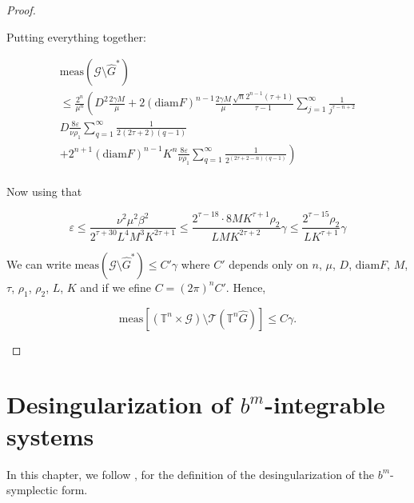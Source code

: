 \begin{proof}
\begin{enumerate}
Putting everything together:


$$
\begin{array}{llc}
\text{meas}(\mathcal{G}\setminus \hat G^*) \\
 \leq  \displaystyle \frac{2^n}{\mu^n}\left( D^2\frac{2\gamma M}{\mu} + 2(\text{diam}F)^{n-1}\frac{2\gamma M}{\mu}\frac{\sqrt{n} 2^{n-1} (\tau+1)}{\tau-1} \sum_{j=1}^\infty \frac{1}{j^{\tau - n + 2}}\right.\\
 \displaystyle  D\frac{8\varepsilon}{\nu \rho_1}\sum_{q=1}^{\infty}\frac{1}{2^{}(2\tau+2)(q-1)} \\
\displaystyle \left. + 2^{n+1}(\text{diam} F)^{n-1} K^n \frac{8\varepsilon}{\nu \rho_1} \sum_{q=1}^\infty \frac{1}{2^{(2\tau+2-n)(q-1)}}\right)\\
\end{array}
$$

Now using that

$$
\varepsilon \leq \frac{\nu^2 \mu^2 \beta^2}{2^{\tau+30} L^4 M^3 K^{2\tau+1}} \leq \frac{2^{\tau-18}\cdot 8 M K^{\tau+1} \rho_2}{L M K^{2\tau+2}}\gamma \leq \frac{2^{\tau-15}\rho_2}{L K^{\tau+1}}\gamma
$$

We can write $\text{meas}(\mathcal{G}\setminus \hat G^*) \leq C' \gamma$ where $C'$ depends only on $n$,  $\mu$,  $D$,  $\text{diam} F$,  $M$,  $\tau$,  $\rho_1$,  $\rho_2$,  $L$,  $K$ and if we efine $C = (2\pi)^n C'$. Hence,

$$\text{meas}[(\mathbb{T}^n \times \mathcal{G}) \setminus \mathcal{T}(\mathbb{T}^n \hat G)] \leq C \gamma.$$



\end{enumerate}
\end{proof}


\chapter[Desingularization of $b^m$-integrable systems]{Desingularization of $b^m$-integrable systems}

In this chapter, we follow \cite{GMW17}, for the definition of the desingularization of the $b^m$-symplectic form.

